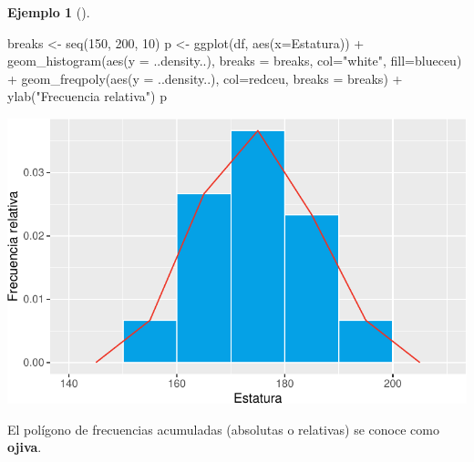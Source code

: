 \documentclass[
  a4paper,
]{scrreport}
\newenvironment{Shaded}{\begin{snugshade}}{\end{snugshade}}
\newcommand{\AttributeTok}[1]{\textcolor[rgb]{0.40,0.45,0.13}{#1}}
\newcommand{\DecValTok}[1]{\textcolor[rgb]{0.68,0.00,0.00}{#1}}
\newcommand{\FunctionTok}[1]{\textcolor[rgb]{0.28,0.35,0.67}{#1}}
\newcommand{\NormalTok}[1]{\textcolor[rgb]{0.00,0.23,0.31}{#1}}
\newcommand{\OtherTok}[1]{\textcolor[rgb]{0.00,0.23,0.31}{#1}}
\newcommand{\SpecialCharTok}[1]{\textcolor[rgb]{0.37,0.37,0.37}{#1}}
\newcommand{\StringTok}[1]{\textcolor[rgb]{0.13,0.47,0.30}{#1}}
\theoremstyle{plain}
\theoremstyle{definition}
\newtheorem{example}{Ejemplo}[chapter]
\theoremstyle{definition}
\theoremstyle{remark}
\begin{document}
\begin{example}[]
\begin{Shaded}
\begin{Highlighting}[]
\NormalTok{breaks }\OtherTok{\textless{}{-}} \FunctionTok{seq}\NormalTok{(}\DecValTok{150}\NormalTok{, }\DecValTok{200}\NormalTok{, }\DecValTok{10}\NormalTok{)}
\NormalTok{p }\OtherTok{\textless{}{-}} \FunctionTok{ggplot}\NormalTok{(df, }\FunctionTok{aes}\NormalTok{(}\AttributeTok{x=}\NormalTok{Estatura)) }\SpecialCharTok{+} 
    \FunctionTok{geom\_histogram}\NormalTok{(}\FunctionTok{aes}\NormalTok{(}\AttributeTok{y =}\NormalTok{ ..density..), }\AttributeTok{breaks =}\NormalTok{ breaks, }\AttributeTok{col=}\StringTok{"white"}\NormalTok{, }\AttributeTok{fill=}\NormalTok{blueceu) }\SpecialCharTok{+}
    \FunctionTok{geom\_freqpoly}\NormalTok{(}\FunctionTok{aes}\NormalTok{(}\AttributeTok{y =}\NormalTok{ ..density..), }\AttributeTok{col=}\NormalTok{redceu, }\AttributeTok{breaks =}\NormalTok{ breaks) }\SpecialCharTok{+}
    \FunctionTok{ylab}\NormalTok{(}\StringTok{"Frecuencia relativa"}\NormalTok{)}
\NormalTok{p}
\end{Highlighting}
\end{Shaded}

\includegraphics{02-estadistica-descriptiva_files/figure-pdf/histograma-frecuencias-relativas-1.pdf}

\end{example}

El polígono de frecuencias acumuladas (absolutas o relativas) se conoce
como \textbf{ojiva}.
\end{document}

